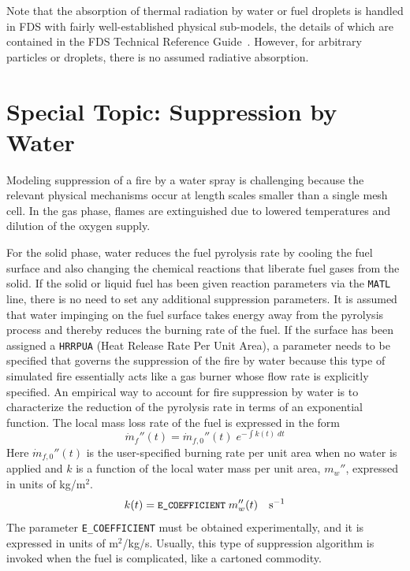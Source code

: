 \documentclass[11pt]{book}
\newcommand{\ct}{\tt\small}
\newcommand{\dm}{\dot{m}}
\newcommand{\be}{\begin{equation}}
\newcommand{\ee}{\end{equation}}
\begin{document}
\begin{warning}
Note that the absorption of thermal radiation by water or fuel droplets is
handled in FDS with fairly well-established physical sub-models, the details
of which are contained in the FDS Technical Reference Guide~\cite{FDS_Math_Guide}.
However, for arbitrary particles or droplets, there is no assumed radiative absorption.
\end{warning}



\clearpage

\section{Special Topic: Suppression by Water}
\label{info:suppression}

Modeling suppression of a fire by a water spray is challenging because
the relevant physical mechanisms occur at length scales smaller than a
single mesh cell. In the gas phase, flames are extinguished due to lowered
temperatures and dilution of the oxygen supply.

For the solid phase,
water reduces the fuel pyrolysis rate by cooling the fuel surface and also
changing the chemical reactions that liberate fuel gases from the solid.
If the solid or liquid fuel has been given reaction parameters via the {\ct MATL} line, there is no
need to set any additional suppression parameters. It is assumed that
water impinging on the fuel surface takes energy away from the
pyrolysis process and thereby reduces the burning rate of the fuel.
If the surface has been assigned a {\ct HRRPUA} (Heat Release Rate Per Unit Area),
a parameter needs to be specified that governs the suppression of the fire by water because this type of simulated
fire essentially acts like a gas burner whose flow rate is explicitly specified.
An empirical way to account for fire suppression by water
is to characterize the reduction of the pyrolysis rate in terms
of an exponential function. The local mass loss rate of the
fuel is expressed in the form
\be \dm_f''(t) = \dm_{f,0}''(t) \; e^{-\int k(t) \; dt} \label{nistexting} \ee
Here $\dm_{f,0}''(t)$ is the user-specified burning rate per unit
area when no water is applied and $k$ is a function of the local water
mass per unit area, $m_w''$, expressed in units of kg/m$^2$.
\be
k(t) = \hbox{\ct E\_COEFFICIENT} \; m_w''(t) \quad          \hbox{s}^{-1}
\ee
The parameter {\ct E\_COEFFICIENT} must be obtained experimentally, and
it is expressed in units of m$^2$/kg/s. Usually, this type of suppression
algorithm is invoked when the fuel is complicated, like a cartoned commodity.
\end{document}
